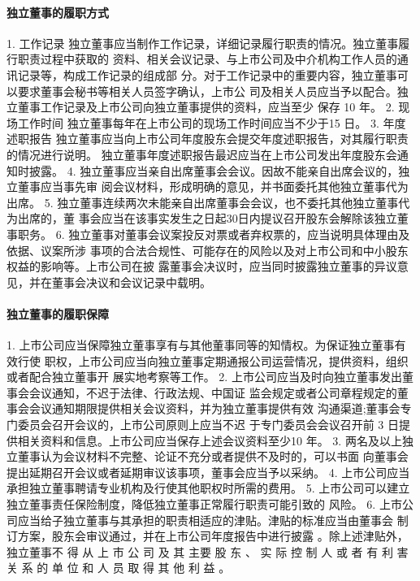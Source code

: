 \documentclass[UTF8,12pt]{ctexart}
\numberwithin{equation}{section} %
\numberwithin{figure}{section}
\numberwithin{table}{section}
\begin{document}
	\paragraph{独立董事的履职方式}
	1. 工作记录 独立董事应当制作工作记录，详细记录履行职责的情况。独立董事履行职责过程中获取的 资料、相关会议记录、与上市公司及中介机构工作人员的通讯记录等，构成工作记录的组成部 分。对于工作记录中的重要内容，独立董事可以要求董事会秘书等相关人员签字确认，上市公 司及相关人员应当予以配合。独立董事工作记录及上市公司向独立董事提供的资料，应当至少 保存 10 年。
	2. 现场工作时间
	独立董事每年在上市公司的现场工作时间应当不少于15 日。
	3. 年度述职报告 独立董事应当向上市公司年度股东会提交年度述职报告，对其履行职责的情况进行说明。 独立董事年度述职报告最迟应当在上市公司发出年度股东会通知时披露。
	4. 独立董事应当亲自出席董事会会议。因故不能亲自出席会议的，独立董事应当事先审 阅会议材料，形成明确的意见，并书面委托其他独立董事代为出席。
	5. 独立董事连续两次未能亲自出席董事会会议，也不委托其他独立董事代为出席的，董 事会应当在该事实发生之日起30日内提议召开股东会解除该独立董事职务。
	6. 独立董事对董事会议案投反对票或者弃权票的，应当说明具体理由及依据、议案所涉 事项的合法合规性、可能存在的风险以及对上市公司和中小股东权益的影响等。上市公司在披 露董事会决议时，应当同时披露独立董事的异议意见，并在董事会决议和会议记录中载明。
	
	\paragraph{独立董事的履职保障}
	1. 上市公司应当保障独立董事享有与其他董事同等的知情权。为保证独立董事有效行使 职权，上市公司应当向独立董事定期通报公司运营情况，提供资料，组织或者配合独立董事开 展实地考察等工作。
	2. 上市公司应当及时向独立董事发出董事会会议通知，不迟于法律、行政法规、中国证 监会规定或者公司章程规定的董事会会议通知期限提供相关会议资料，并为独立董事提供有效 沟通渠道;董事会专门委员会召开会议的，上市公司原则上应当不迟 于专门委员会会议召开前 3 日提供相关资料和信息。上市公司应当保存上述会议资料至少10 年。
	3. 两名及以上独立董事认为会议材料不完整、论证不充分或者提供不及时的，可以书面 向董事会提出延期召开会议或者延期审议该事项，董事会应当予以采纳。
	4. 上市公司应当承担独立董事聘请专业机构及行使其他职权时所需的费用。
	5. 上市公司可以建立独立董事责任保险制度，降低独立董事正常履行职责可能引致的 风险。
	6. 上市公司应当给子独立董事与其承担的职责相适应的津贴。津贴的标准应当由董事会 制订方案，股东会审议通过，并在上市公司年度报告中进行披露 。除上述津贴外，独立董事不 得 从 上 市 公 司 及 其 主要 股 东 、 实 际 控 制 人 或 者 有 利 害 关 系 的 单 位 和 人 员 取 得 其 他 利 益 。
	
\end{document}
